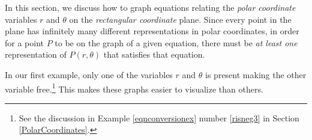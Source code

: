 \documentclass{ximera}
\begin{document}
	\author{Stitz-Zeager}




\setcounter{footnote}{0}

\label{PolarGraphs}

In this section, we discuss how to graph equations relating the \textit{polar coordinate} variables $r$ and $\theta$  on the \textit{rectangular coordinate} plane.  Since every point in the plane has infinitely many different representations in polar coordinates, in order for a point $P$ to be on the graph of a given equation,  there must be \textit{at least one} representation of $P(r, \theta)$ that satisfies that equation.  

\smallskip

In our first example,  only one of the variables $r$ and $\theta$ is present making the other variable free.\footnote{See the discussion in Example \ref{eqnconversionex} number \ref{risneg3} in Section \ref{PolarCoordinates}.}  This makes these graphs easier to visualize than others.


\smallskip
\end{document}
